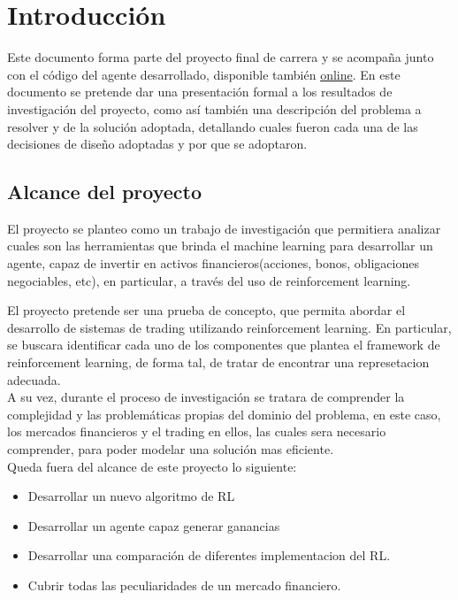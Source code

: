 \chapter{Introducción}

Este documento forma parte del proyecto final de carrera y se acompaña junto con el código del agente desarrollado, disponible también \href{https://github.com/jcaramello/deepQ-stock/}{online}. En este documento se pretende dar una presentación formal a los resultados de investigación del proyecto, como así también una descripción del problema a resolver y de la solución adoptada, detallando cuales fueron cada una de las decisiones de diseño adoptadas y por que se adoptaron.

\section{Alcance del proyecto}
El proyecto se planteo como un trabajo de investigación que permitiera analizar cuales son las herramientas que brinda el machine learning para desarrollar un agente, capaz de invertir en activos financieros(acciones, bonos, obligaciones negociables, etc), en particular, a través  del uso de reinforcement learning.

El proyecto pretende ser una prueba de concepto, que permita abordar el desarrollo de sistemas de trading utilizando reinforcement learning. En particular, se buscara identificar cada uno de los componentes que plantea el framework de reinforcement learning, de forma tal, de tratar de encontrar una represetacion adecuada.
\\
A su vez, durante el proceso de investigación se tratara de comprender la complejidad y las problemáticas propias del dominio del problema, en este caso, los mercados financieros y el trading en ellos, las cuales sera necesario comprender, para poder modelar una solución mas eficiente.
\\
Queda fuera del alcance de este proyecto lo siguiente:

\begin{itemize} %
	\item Desarrollar un nuevo algoritmo de RL
	\item Desarrollar un agente capaz generar ganancias
	\item Desarrollar una comparación de diferentes implementacion del RL.
    \item Cubrir todas las peculiaridades de un mercado financiero.
\end{itemize}

